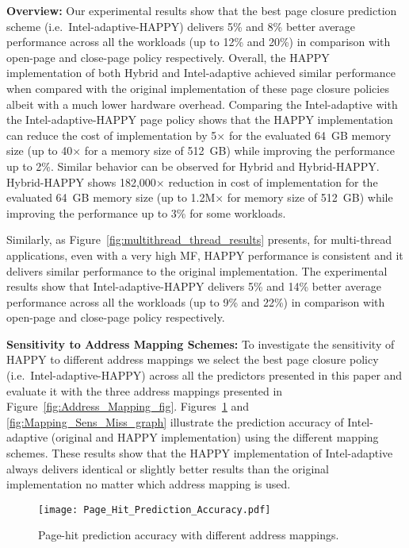 {\bf Overview:} Our experimental results show that the best page closure prediction scheme (i.e.\ Intel-adaptive-HAPPY) delivers 5\% and 8\% better average performance across all the workloads (up to 12\% and 20\%) in comparison with open-page and close-page policy respectively. Overall, the HAPPY implementation of both Hybrid and Intel-adaptive achieved similar performance when compared with the original implementation of these page closure policies albeit with a much lower hardware overhead. Comparing the Intel-adaptive with the Intel-adaptive-HAPPY page policy shows that the HAPPY implementation can reduce the cost of implementation by 5$\times$ for the evaluated 64~GB memory size (up to 40$\times$ for a memory size of 512~GB) while improving the performance up to 2\%. Similar behavior can be observed for Hybrid and Hybrid-HAPPY. Hybrid-HAPPY shows 182,000$\times$ reduction in cost of implementation for the evaluated 64~GB memory size (up to 1.2M$\times$ for memory size of 512~GB) while improving the performance up to 3\% for some workloads.

Similarly, as Figure~\ref{fig:multithread_thread_results} presents, for multi-thread applications, even with a very high MF, HAPPY performance is consistent and it delivers similar performance to the original implementation. The experimental results show that Intel-adaptive-HAPPY delivers 5\% and 14\% better average performance across all the workloads (up to 9\% and 22\%) in comparison with open-page and close-page policy respectively. 








{\bf Sensitivity to Address Mapping Schemes:} To investigate the sensitivity of HAPPY to different address mappings we select the best page closure policy (i.e.\ Intel-adaptive-HAPPY) across all the predictors presented in this paper and evaluate it with the three address mappings presented in Figure~\ref{fig:Address_Mapping_fig}. Figures~\ref{fig:Mapping_Sens_Hit_graph} and  \ref{fig:Mapping_Sens_Miss_graph} illustrate the prediction accuracy of Intel-adaptive (original and HAPPY implementation) using the different mapping schemes. These results show that the HAPPY implementation of Intel-adaptive always delivers identical or slightly better results than the original implementation no matter which address mapping is used.

\begin{figure}[!htb]
\centering
\texttt{[image: Page\_Hit\_Prediction\_Accuracy.pdf]}
\caption{Page-hit prediction accuracy with different address mappings.}
\label{fig:Mapping_Sens_Hit_graph}
\end{figure}


